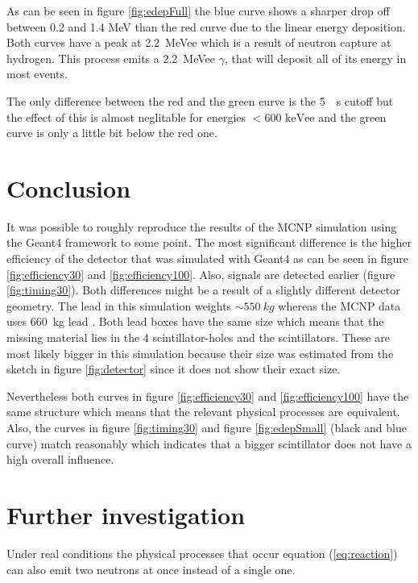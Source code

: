 \documentclass[12pt]{article}
\begin{document}
 As can be seen in figure \ref{fig:edepFull} the blue curve shows a sharper drop off between 0.2 and 1.4 MeV than the red curve due to the linear energy deposition. Both curves have a peak at \SI{2.2}{MeVee} which is a result of neutron capture at hydrogen. This process emits a \SI{2.2}{MeVee} $\gamma$, that will deposit all of its energy in most events.
 
The only difference between the red and the green curve is the \SI{5}{\SIUnitSymbolMicro s} cutoff but the effect of this is almost neglitable for energies $<600 \text{ keVee}$ and the green curve is only a little bit below the red one.
 
\section{Conclusion}
It was possible to roughly reproduce the results of the MCNP simulation using the Geant4 framework to some point. The most significant difference is the higher efficiency of the detector that was simulated with Geant4 as can be seen in figure \ref{fig:efficiency30} and \ref{fig:efficiency100}. Also, signals are detected earlier (figure \ref{fig:timing30}). Both differences might be a result of a slightly different detector geometry. The lead in this simulation weights $\sim \SI{550}{kg}$ whereas the MCNP data uses \SI{660}{kg} lead \cite[p.1]{MCNP}. Both lead boxes have the same size which means that the missing material lies in the 4 scintillator-holes and the scintillators. These are most likely bigger in this simulation because their size was estimated from the sketch in figure \ref{fig:detector} since it does not show their exact size.

Nevertheless both curves in figure \ref{fig:efficiency30} and \ref{fig:efficiency100} have the same structure which means that the relevant physical processes are equivalent. Also, the curves in figure \ref{fig:timing30} and figure \ref{fig:edepSmall} (black and blue curve) match reasonably which indicates that a bigger scintillator does not have a high overall influence.

\section{Further investigation}
Under real conditions the physical processes that occur equation (\ref{eq:reaction}) can also emit two neutrons at once instead of a single one. 
\end{document}
